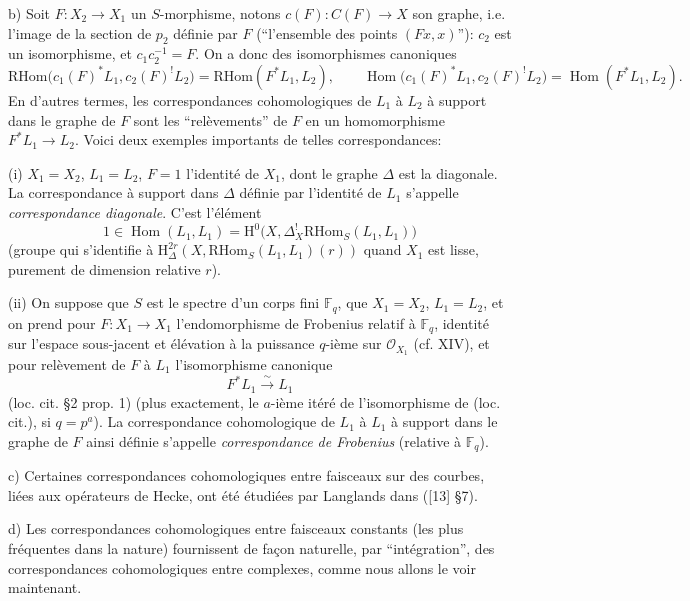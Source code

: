 \documentclass[11pt]{article}
\renewcommand{\H}{\mathrm{H}}
\DeclareMathOperator{\Hom}{Hom}
\providecommand{\RHom}{\mathrm{RHom}}
\providecommand{\RHom}{\mathrm{RHom}}
\providecommand{\Hom}{\operatorname{Hom}}
\providecommand{\RHom}{\mathrm R\mathcal{H}om}
\providecommand{\RHom}{\mathrm{RHom}}
\providecommand{\Hom}{\operatorname{Hom}}
\begin{document}
b) Soit $F:X_2\to X_1$ un $S$-morphisme, notons $c(F):C(F)\to X$ son graphe, i.e. l'image de la section de $p_2$ définie par $F$ (``l'ensemble des points $(Fx,x)$''): $c_2$ est un isomorphisme, et $c_1c_2^{-1}=F$. On a donc des isomorphismes canoniques
\begin{equation}
\RHom\bigl(c_1(F)^*L_1,c_2(F)^!L_2\bigr)=\RHom(F^*L_1,L_2),
\qquad
\Hom\bigl(c_1(F)^*L_1,c_2(F)^!L_2\bigr)=\Hom(F^*L_1,L_2).
\tag{3.2.6}
\end{equation}
En d'autres termes, les correspondances cohomologiques de $L_1$ à $L_2$ à support dans le graphe de $F$ sont les ``relèvements'' de $F$ en un homomorphisme $F^*L_1\to L_2$. Voici deux exemples importants de telles correspondances:

(i) $X_1=X_2$, $L_1=L_2$, $F=1$ l'identité de $X_1$, dont le graphe $\Delta$ est la diagonale. La correspondance à support dans $\Delta$ définie par l'identité de $L_1$ s'appelle \emph{correspondance diagonale}. C'est l'élément
\[
1\in \Hom(L_1,L_1)=\H^0\bigl(X,\Delta_X^!\RHom_S(L_1,L_1)\bigr)
\]
(groupe qui s'identifie à $\H^{2r}_\Delta(X,\RHom_S(L_1,L_1)(r))$ quand $X_1$ est lisse, purement de dimension relative $r$).

(ii) On suppose que $S$ est le spectre d'un corps fini $\mathbb F_q$, que $X_1=X_2$, $L_1=L_2$, et on prend pour $F:X_1\to X_1$ l'endomorphisme de Frobenius relatif à $\mathbb F_q$, identité sur l'espace sous-jacent et élévation à la puissance $q$-ième sur $\mathcal O_{X_1}$ (cf. XIV), et pour relèvement de $F$ à $L_1$ l'isomorphisme canonique
\[
F^*L_1\xrightarrow{\sim}L_1
\]
(loc. cit. §2 prop. 1) (plus exactement, le $a$-ième itéré de l'isomorphisme de (loc. cit.), si $q=p^a$). La correspondance cohomologique de $L_1$ à $L_1$ à support dans le graphe de $F$ ainsi définie s'appelle \emph{correspondance de Frobenius} (relative à $\mathbb F_q$).

c) Certaines correspondances cohomologiques entre faisceaux sur des courbes, liées aux opérateurs de Hecke, ont été étudiées par Langlands dans ([13] §7).

d) Les correspondances cohomologiques entre faisceaux constants (les plus fréquentes dans la nature) fournissent de façon naturelle, par ``intégration'', des correspondances cohomologiques entre complexes, comme nous allons le voir maintenant.
\end{document}
